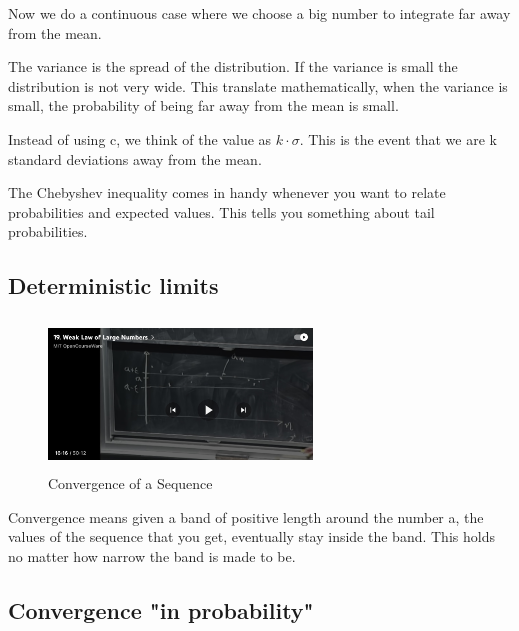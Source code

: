 \documentclass{article}
\begin{document}

Now we do a continuous case where we choose a big number to integrate far away from the mean.

 The variance is the spread of the distribution. If the variance is small the distribution is not very wide.  This translate mathematically, when the variance is small, the probability of being far away from the mean is small.

Instead of using c, we think of the value as $k\cdot \sigma$.  This is the event that we are k standard deviations away from the mean.

The Chebyshev inequality comes in handy whenever you want to relate probabilities and expected values.  This tells you something about tail probabilities.

\subsection{Deterministic limits}



\begin{figure}[ht]
\centering
\includegraphics[width=7cm, height=4cm]{images/L19/IMG_3316.jpeg}
\caption{Convergence of a Sequence}
\end{figure}

Convergence means given a band of positive length around the number a, the values of the sequence that you get, eventually stay inside the band.  This holds no matter how narrow the band is made to be.

\subsection{Convergence "in probability"}

\end{document}
